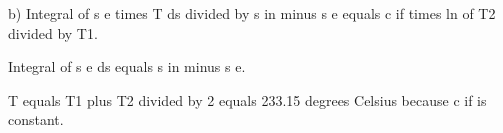 b) Integral of s e times T ds divided by s in minus s e equals c if times ln of T2 divided by T1.  

Integral of s e ds equals s in minus s e.  

T equals T1 plus T2 divided by 2 equals 233.15 degrees Celsius because c if is constant.
